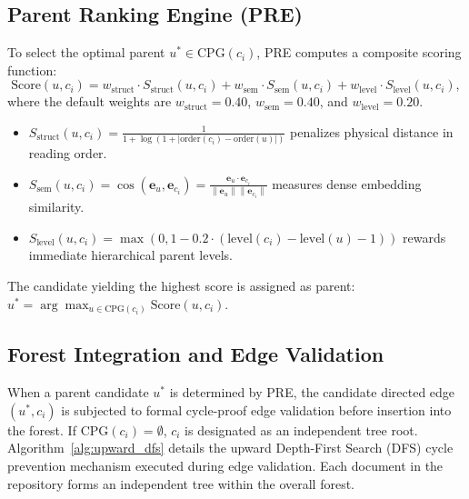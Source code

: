 \documentclass[12pt,a4paper]{report}
\begin{document}
\subsection{Parent Ranking Engine (PRE)}
To select the optimal parent $u^* \in \text{CPG}(c_i)$, PRE computes a composite scoring function:
\begin{equation}
\text{Score}(u, c_i) = w_{\text{struct}} \cdot S_{\text{struct}}(u, c_i) + w_{\text{sem}} \cdot S_{\text{sem}}(u, c_i) + w_{\text{level}} \cdot S_{\text{level}}(u, c_i),
\label{eq:pre_scoring}
\end{equation}
where the default weights are $w_{\text{struct}} = 0.40$, $w_{\text{sem}} = 0.40$, and $w_{\text{level}} = 0.20$.
\begin{itemize}
    \item $S_{\text{struct}}(u, c_i) = \frac{1}{1 + \log(1 + |\text{order}(c_i) - \text{order}(u)|)}$ penalizes physical distance in reading order.
    \item $S_{\text{sem}}(u, c_i) = \cos(\mathbf{e}_u, \mathbf{e}_{c_i}) = \frac{\mathbf{e}_u \cdot \mathbf{e}_{c_i}}{\|\mathbf{e}_u\| \|\mathbf{e}_{c_i}\|}$ measures dense embedding similarity.
    \item $S_{\text{level}}(u, c_i) = \max(0, 1 - 0.2 \cdot (\text{level}(c_i) - \text{level}(u) - 1))$ rewards immediate hierarchical parent levels.
\end{itemize}
The candidate yielding the highest score is assigned as parent: $u^* = \arg\max_{u \in \text{CPG}(c_i)} \text{Score}(u, c_i)$.

\subsection{Forest Integration and Edge Validation}
When a parent candidate $u^*$ is determined by PRE, the candidate directed edge $(u^*, c_i)$ is subjected to formal cycle-proof edge validation before insertion into the forest. If $\text{CPG}(c_i) = \emptyset$, $c_i$ is designated as an independent tree root. Algorithm~\ref{alg:upward_dfs} details the upward Depth-First Search (DFS) \cite{tarjan1972depth} cycle prevention mechanism executed during edge validation. Each document in the repository forms an independent tree within the overall forest.
\end{document}
